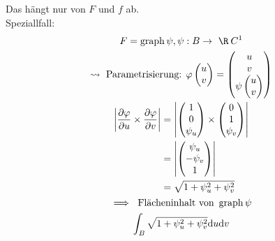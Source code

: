 \begin{fakt}
	Das hängt nur von $F$ und $f$ ab. \\
	Speziallfall:
	\begin{gather*}
		F = \graph \psi , \psi : B \rightarrow \R \: C^1 \\
		\rightsquigarrow \text{ Parametrisierung: } \phi\begin{pmatrix} u \\ v \end{pmatrix} = \begin{pmatrix} u \\ v \\ \psi\begin{pmatrix} u \\ v \end{pmatrix} \end{pmatrix} \\
		\begin{split}
			\abs{\frac{\partial \phi}{\partial u} \times \frac{\partial \phi}{\partial v}}
				&= \abs{\begin{pmatrix} 1 \\ 0 \\ \psi_u \end{pmatrix} \times \begin{pmatrix} 0 \\ 1 \\ \psi_v \end{pmatrix}} \\
				&= \abs{\begin{pmatrix} \psi_u \\ -\psi_v \\ 1 \end{pmatrix}} \\
				&= \sqrt{1 + \psi_u^2 + \psi_v^2}
		\end{split} \\
		\implies \text{ Flächeninhalt von } \graph \psi \\
		\int_B \sqrt{1 + \psi_u^2 + \psi_v^2} \dd u \dd v
	\end{gather*}
\end{fakt}
